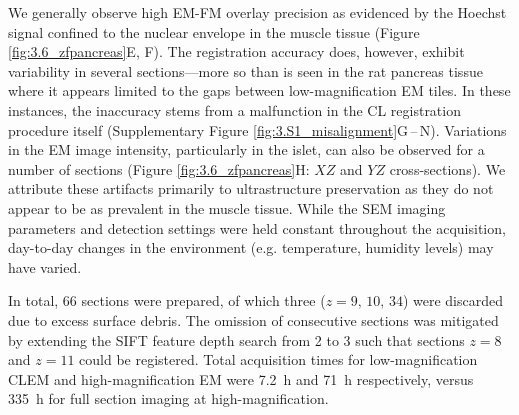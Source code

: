 We generally observe high EM-FM overlay precision as evidenced by the Hoechst signal confined to the nuclear envelope in the muscle tissue (Figure \ref{fig:3.6_zfpancreas}E, F). The registration accuracy does, however, exhibit variability in several sections---more so than is seen in the rat pancreas tissue where it appears limited to the gaps between low-magnification EM tiles. In these instances, the inaccuracy stems from a malfunction in the CL registration procedure itself (Supplementary Figure \ref{fig:3.S1_misalignment}G\,--\,N). Variations in the EM image intensity, particularly in the islet, can also be observed for a number of sections (Figure \ref{fig:3.6_zfpancreas}H: $XZ$ and $YZ$ cross-sections). We attribute these artifacts primarily to ultrastructure preservation as they do not appear to be as prevalent in the muscle tissue. While the SEM imaging parameters and detection settings were held constant throughout the acquisition, day-to-day changes in the environment (e.g. temperature, humidity levels) may have varied.

In total, 66 sections were prepared, of which three ($z = \text{9, 10, 34}$) were discarded due to excess surface debris. The omission of consecutive sections was mitigated by extending the SIFT feature depth search from 2 to 3 such that sections $z = \text{8}$ and $z = \text{11}$ could be registered. Total acquisition times for low-magnification CLEM and high-magnification EM were \SI{7.2}{\hour} and \SI{71}{\hour} respectively, versus \SI{335}{\hour} for full section imaging at high-magnification.
